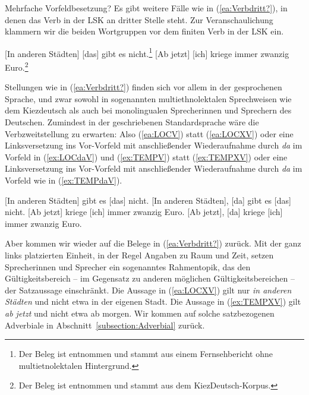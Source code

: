 \begin{Exkurs}{Mehrfache Vorfeldbesetzung?}
Es gibt weitere Fälle wie in (\ref{ea:Verbdritt?}), in denen das Verb in der LSK an dritter Stelle steht. Zur Veranschaulichung klammern wir die beiden Wortgruppen vor dem finiten Verb in der LSK ein.

\ea\label{ea:Verbdritt?}
\ea \label{ea:LOCXV} [In anderen Städten] [das] gibt es nicht.\footnote{Der Beleg ist \citet[2]{Schalowski2017} entnommen und stammt aus einem Fernsehbericht ohne multietnolektalen Hintergrund.}
\ex \label{ex:TEMPXV} [Ab jetzt] [ich] kriege immer zwanzig Euro.\footnote{Der Beleg ist \citet[84]{Freywald_al_2015} entnommen und stammt aus dem KiezDeutsch-Korpus.}
\z 
\z 

Stellungen wie in (\ref{ea:Verbdritt?}) finden sich vor allem in der gesprochenen Sprache, und zwar sowohl in sogenannten multiethnolektalen Sprechweisen wie dem Kiezdeutsch als auch bei monolingualen Sprecherinnen und Sprechern des Deutschen. Zumindest in der geschriebenen Standardsprache wäre die Verbzweitstellung zu erwarten: Also (\ref{ea:LOCV}) statt (\ref{ea:LOCXV}) oder eine Linksversetzung ins Vor-Vorfeld mit anschließender Wiederaufnahme durch \textit{da} im Vorfeld in (\ref{ex:LOCdaV}) und (\ref{ex:TEMPV}) statt (\ref{ex:TEMPXV}) oder eine Linksversetzung ins Vor-Vorfeld mit anschließender Wiederaufnahme durch \textit{da} im Vorfeld wie in (\ref{ex:TEMPdaV}). 

\ea\label{ea:VerbdrittzuVerbzweit}
\ea \label{ea:LOCV} [In anderen Städten] gibt es [das] nicht.
\ex \label{ex:LOCdaV} [In anderen Städten], [da] gibt es [das] nicht.
\ex \label{ex:TEMPV} [Ab jetzt] kriege [ich] immer zwanzig Euro.
\ex \label{ex:TEMPdaV} [Ab jetzt], [da] kriege [ich] immer zwanzig Euro.
\z 
\z 

Aber kommen wir wieder auf die Belege in (\ref{ea:Verbdritt?}) zurück. Mit der ganz links platzierten Einheit, in der Regel Angaben zu Raum und Zeit, setzen Sprecherinnen und Sprecher ein sogenanntes Rahmentopik, das den Gültigkeitsbereich – im Gegensatz zu anderen möglichen Gültigkeitsbereichen – der Satzaussage einschränkt. Die Aussage in (\ref{ea:LOCXV}) gilt nur \textit{in anderen Städten} und nicht etwa in der eigenen Stadt. Die Aussage in (\ref{ex:TEMPXV}) gilt \textit{ab jetzt} und nicht etwa ab morgen. Wir kommen auf solche satzbezogenen Adverbiale in Abschnitt~\ref{subsection:Adverbial} zurück. 


\end{Exkurs}

